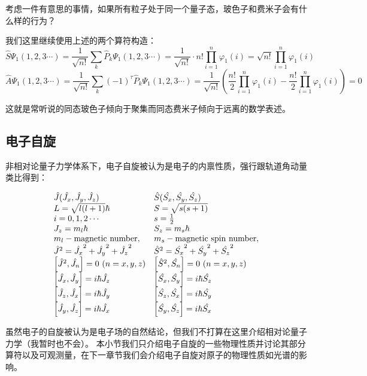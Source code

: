考虑一件有意思的事情，如果所有粒子处于同一个量子态，玻色子和费米子会有什么样的行为？

我们这里继续使用上述的两个算符构造：
\[\hat{S}\varPsi_{1}(1,2,3 \cdots)=\frac{1}{\sqrt{n!}}\sum_{k}\hat{P}_{k}\varPsi_{1}(1,2,3 \cdots)=\frac{1}{\sqrt{n!}}\cdot n!\prod_{i=1}^n\varphi_1(i)=\sqrt{n!}\prod_{i=1}^n\varphi_1(i)\]
\[\hat{A}\varPsi_{1}(1,2,3 \cdots)=\frac{1}{\sqrt{n!}}\sum_{k}(-1)^{\tau}\hat{P}_{k}\varPsi_{1}(1,2,3 \cdots)=\frac{1}{\sqrt{n!}}\left (\frac{n!}{2}\prod_{i=1}^n\varphi_1(i)-\frac{n!}{2}\prod_{i=1}^n\varphi_1(i) \right )=0\]

这就是常听说的同态玻色子倾向于聚集而同态费米子倾向于远离的数学表述。

\subsection{电子自旋}
非相对论量子力学体系下，电子自旋被认为是电子的内禀性质，强行跟轨道角动量类比得到：

\[
    \begin{array}{ll}
        \hat{J}(\hat{J_x},\hat{J_y},\hat{J_z}) & \hat{S}(\hat{S_x},\hat{S_y},\hat{S_z}) \\
        L=\sqrt{l(l+1)}\hbar & S=\sqrt{s(s+1)}\\
        i=0,1,2 \cdots & s=\frac{1}{2}\\
        J_z=m_l\hbar & S_z=m_s\hbar\\
        m_l - \text{magnetic number}, & m_s - \text{magnetic spin number},\\
        \hat{J}^2=\hat{J_x}^2+\hat{J_y}^2+\hat{J_z}^2 & \hat{S}^2=\hat{S_x}^2+\hat{S_y}^2+\hat{S_z}^2 \\
        \qty[\hat{J}^2,\hat{J_n}]=0 \ (n=x,y,z) & \qty[\hat{S}^2,\hat{S_n}]=0 \ (n=x,y,z)\\
        \qty[\hat{J_x},\hat{J_y}]=i\hbar\hat{J_z} & \qty[\hat{S_x},\hat{S_y}]=i\hbar\hat{S_z}\\
        \qty[\hat{J_z},\hat{J_x}]=i\hbar\hat{J_y} & \qty[\hat{S_z},\hat{S_x}]=i\hbar\hat{S_y}\\
        \qty[\hat{J_y},\hat{J_z}]=i\hbar\hat{J_x} & \qty[\hat{S_y},\hat{S_z}]=i\hbar\hat{S_x}
    \end{array}
\]

虽然电子的自旋被认为是电子场的自然结论，但我们不打算在这里介绍相对论量子力学（我暂时也不会）。
本小节我们只介绍电子自旋的一些物理性质并讨论其部分算符以及可观测量，在下一章节我们会介绍电子自旋对原子的物理性质如光谱的影响。

